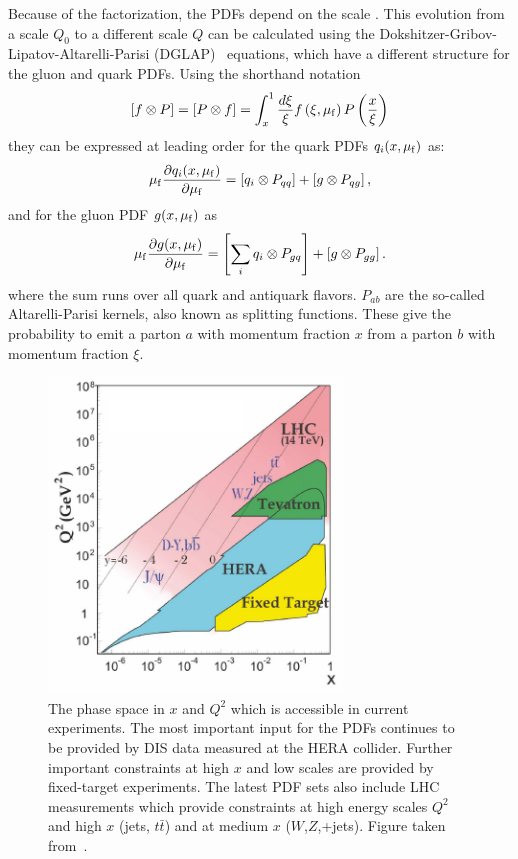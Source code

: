 Because of the factorization, the PDFs depend on the scale \muf. This evolution
from a scale $Q_0$ to a different scale $Q$ can be calculated using the
Dokshitzer-Gribov-Lipatov-Altarelli-Parisi
(DGLAP)~\cite{Gribov:1972ri,Altarelli:1977zs,Dokshitzer:1977sg} equations, which
have a different structure for the gluon and quark PDFs. Using the shorthand notation
%
\begin{equation*}
    \left[f \otimes P \right] = \left[ P \otimes f \right] = \int_x^1 \frac{d
    \xi}{\xi} f\left(\xi, \mu_{\mathrm{f}}\right) P\left( \frac{x}{\xi} \right)
\end{equation*}
%
they can be expressed at leading order for the quark PDFs $q_i(x, \mu_{\mathrm{f}})$ as:
\begin{equation*}
    \mu_{\mathrm{f}} \frac{\partial q_i (x, \mu_{\mathrm{f}})}{\partial \mu_{\mathrm{f}}} = \left[ q_i \otimes P_{qq}
    \right] + \left[ g \otimes P_{qg} \right],
\end{equation*}
%
and for the gluon PDF $g(x, \mu_{\mathrm{f}})$ as
%
\begin{equation*}
    \mu_{\mathrm{f}} \frac{\partial g (x, \mu_{\mathrm{f}})}{\partial \mu_{\mathrm{f}}} = \left[\sum_i  q_i \otimes P_{gq}
    \right] + \left[g \otimes P_{gg}\right].
\end{equation*}
%
where the sum runs over all quark and antiquark flavors. $P_{ab}$ are the
so-called Altarelli-Parisi kernels, also known as splitting functions. These
give the probability to emit a parton $a$ with momentum fraction $x$ from a
parton $b$ with momentum fraction $\xi$.


\begin{figure}[tb] 
    \centering
    \includegraphics[width=0.7\textwidth]{figures/theoretical_foundations/phasespace.pdf}\hfill
    \caption[Kinematic phase space region of the experiments]{The phase space
        in $x$ and $Q^2$ which is accessible in current experiments.  The most
        important input for the PDFs continues to be provided by DIS
        data measured at the HERA collider. Further important constraints at
        high $x$ and low scales are provided by fixed-target experiments. The
        latest PDF sets also include LHC measurements which provide constraints
        at high energy scales $Q^2$ and high $x$ (jets, $t\bar t$) and at medium $x$
        ($W$,$Z$,+jets). Figure taken from~\cite{Agashe:2014kda}.} 
    \label{fig:kinematic_phasepace} 
\end{figure}

